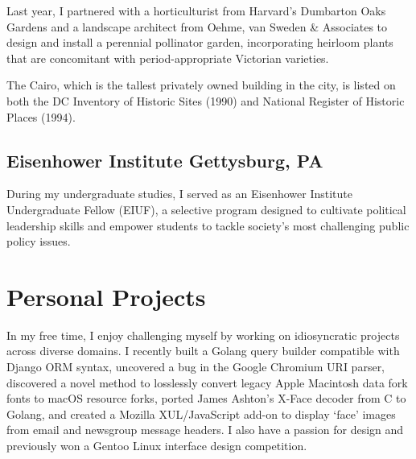 \documentclass[]{article}
\begin{document}

Last year, I partnered with a horticulturist from Harvard’s Dumbarton Oaks Gardens and a landscape architect from Oehme, van Sweden \& Associates to design and install a perennial pollinator garden, incorporating heirloom plants that are concomitant with period-appropriate Victorian varieties.

The Cairo, which is the tallest privately owned building in the city, is listed on both the DC Inventory of Historic Sites (1990) and National Register of Historic Places (1994).


\subsection*{Eisenhower Institute \hfill \textnormal{Gettysburg, PA}}

During my undergraduate studies, I served as an Eisenhower Institute Undergraduate Fellow (EIUF), a selective program designed to cultivate political leadership skills and empower students to tackle society’s most challenging public policy issues.

\section*{Personal Projects}

In my free time, I enjoy challenging myself by working on idiosyncratic projects across diverse domains. I recently built a Golang query builder compatible with Django ORM syntax, uncovered a bug in the Google Chromium URI parser, discovered a novel method to losslessly convert legacy Apple Macintosh data fork fonts to macOS resource forks, ported James Ashton’s X-Face decoder from C to Golang, and created a Mozilla XUL/JavaScript add-on to display ‘face’ images from email and newsgroup message headers. I also have a passion for design and previously won a Gentoo Linux interface design competition.
\end{document}
